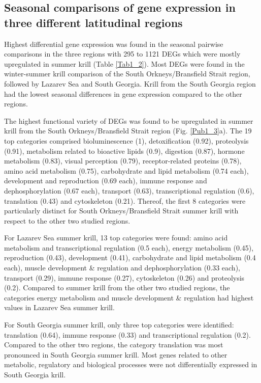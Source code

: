 \subsection{Seasonal comparisons of gene expression in three different latitudinal regions}

Highest differential gene expression was found in the seasonal pairwise
comparisons in the three regions with 295 to 1121 DEGs which were mostly
upregulated in summer krill (Table \ref{Tab1_2}). Most DEGs were found in the
winter-summer krill comparison of the South Orkneys/Bransfield Strait region,
followed by Lazarev Sea and South Georgia. Krill from the South Georgia region
had the lowest seasonal differences in gene expression compared to the other
regions.

The highest functional variety of DEGs was found to be upregulated in summer
krill from the South Orkneys/Bransfield Strait region (Fig. \ref{Pub1_3}a). The
19 top categories comprised bioluminescence (1), detoxification (0.92),
proteolysis (0.91), metabolism related to bioactive lipids (0.9), digestion
(0.87), hormone metabolism (0.83), visual perception (0.79),  receptor-related
proteins (0.78), amino acid metabolism (0.75), carbohydrate and lipid
metabolism (0.74 each), development and reproduction (0.69 each), immune
response and dephosphorylation (0.67 each), transport (0.63), transcriptional
regulation (0.6), translation (0.43) and cytoskeleton (0.21). Thereof, the
first 8 categories were particularly distinct for South Orkneys/Bransfield
Strait summer krill with respect to the other two studied regions.

For Lazarev Sea summer krill, 13 top categories were found: amino acid
metabolism and transcriptional regulation (0.5 each), energy metabolism (0.45),
reproduction (0.43), development (0.41), carbohydrate and lipid metabolism (0.4
each), muscle development \& regulation and dephosphorylation (0.33 each),
transport (0.29), immune response (0.27), cytoskeleton (0.26) and proteolysis
(0.2). Compared to summer krill from the other two studied  regions, the
categories energy metabolism and muscle development \& regulation had highest
values in Lazarev Sea summer krill. 

For South Georgia summer krill, only three top categories were identified:
translation (0.64), immune response (0.33) and transcriptional regulation
(0.2). Compared to the other two regions, the category translation was most
pronounced in South Georgia summer krill. Most genes related to other
metabolic, regulatory and biological processes were not differentially
expressed in South Georgia krill.

